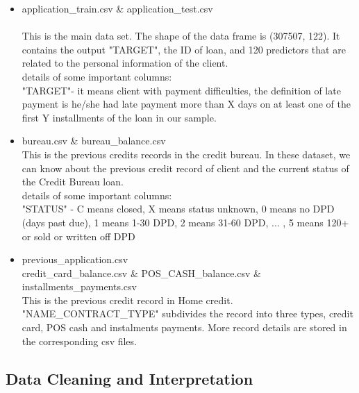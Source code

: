 \documentclass{article}
\begin{document}
\begin{itemize}

\item application\_train.csv  \& application\_test.csv \\
\\
This is the main data set. The shape of the data frame is (307507, 122). It contains the output "TARGET", the ID of loan, and 120 predictors that are related to the personal information of the client. \\

details of some important columns: \\
 "TARGET"- it means client with payment difficulties, the definition of late payment is he/she had late payment more than X days on at least one of the first Y installments of the loan in our sample. \\

\item bureau.csv  \& bureau\_balance.csv \\

This is the previous credits records in the credit bureau. In these dataset, we can know about the previous credit record of client and the current status of the Credit Bureau loan. \\

details of some important columns: \\
"STATUS" - C means closed, X means status unknown, 0 means no DPD (days past due), 1 means 1-30 DPD, 2 means 31-60 DPD, ... , 5 means 120+ or sold or written off 
DPD 
\\

\item previous\_application.csv \\
 credit\_card\_balance.csv \& POS\_CASH\_balance.csv \& installments\_payments.csv \\

This is the previous credit record in Home credit. "NAME\_CONTRACT\_TYPE" subdivides the record into three types, credit card, POS cash and instalments payments. More record details are stored in the corresponding csv files. \\


\end{itemize}

\subsection{Data Cleaning and Interpretation}
\end{document}
